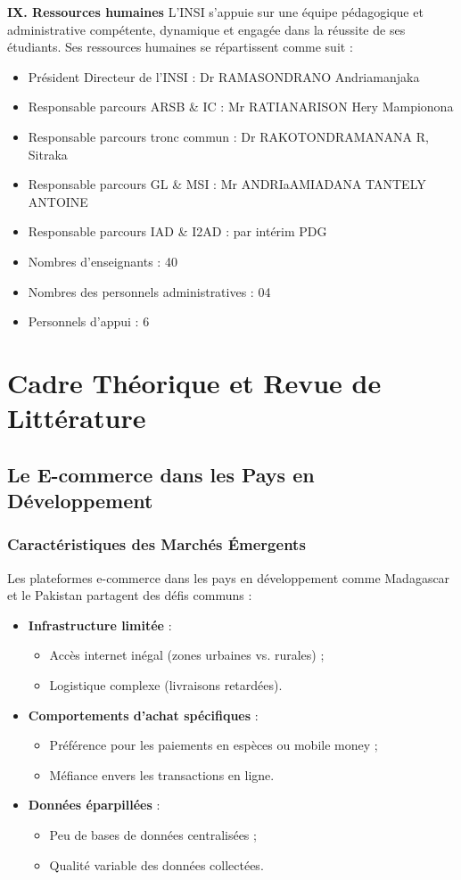 \documentclass[a4paper,12pt]{article}
\begin{document}
\textbf{IX. Ressources humaines} 
L’INSI s’appuie sur une équipe pédagogique et administrative compétente, dynamique et engagée dans la réussite de ses étudiants. Ses ressources humaines se répartissent comme suit :
\begin{itemize}
    \item Président Directeur de l’INSI : Dr RAMASONDRANO Andriamanjaka
    \item Responsable parcours ARSB \& IC : Mr RATIANARISON Hery Mampionona
    \item Responsable parcours tronc commun : Dr RAKOTONDRAMANANA R, Sitraka
    \item Responsable parcours GL \& MSI : Mr ANDRIaAMIADANA TANTELY ANTOINE
    \item Responsable parcours IAD \& I2AD : par intérim PDG
    \item Nombres d'enseignants : 40
    \item Nombres des personnels administratives : 04
    \item Personnels d’appui : 6
\end{itemize}
\chapter{Cadre Théorique et Revue de Littérature}

\section{Le E-commerce dans les Pays en Développement}

\subsection{Caractéristiques des Marchés Émergents}
Les plateformes e-commerce dans les pays en développement comme Madagascar et le Pakistan partagent des défis communs :
\begin{itemize}
    \item \textbf{Infrastructure limitée} :
    \begin{itemize}
        \item Accès internet inégal (zones urbaines vs. rurales) ;
        \item Logistique complexe (livraisons retardées).
    \end{itemize}
    \item \textbf{Comportements d'achat spécifiques} :
    \begin{itemize}
        \item Préférence pour les paiements en espèces ou mobile money ;
        \item Méfiance envers les transactions en ligne.
    \end{itemize}
    \item \textbf{Données éparpillées} :
    \begin{itemize}
        \item Peu de bases de données centralisées ;
        \item Qualité variable des données collectées.
    \end{itemize}
\end{itemize}
\end{document}
